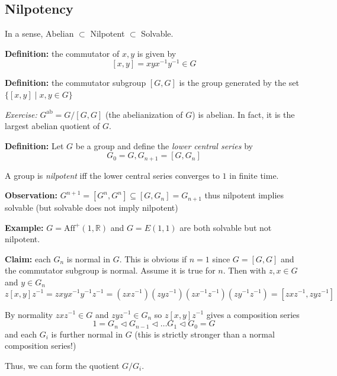 \documentclass[12pt]{article}
\newcommand{\R}{\mathbb{R}}
\begin{document}
\subsection*{Nilpotency} 
    In a sense, Abelian $\subset$ Nilpotent $\subset$ Solvable. 

    \textbf{Definition:} the commutator of $x, y$ is given by 
    \[[x, y] = xyx^{-1}y^{-1} \in G\]

    \textbf{Definition:} the commutator subgroup $[G, G]$ is the group generated by the set $\{[x, y] \; | \; x, y \in G\}$

    \emph{Exercise:} $G^{\text{ab}} = G/[G, G]$ (the abelianization of $G$) is abelian. In fact, it is the largest abelian quotient of $G$. 

    \textbf{Definition:} Let $G$ be a group and define the \emph{lower central series} by  
    \[G_0 = G, G_{n+1} = [G, G_n]\] 
    
    A group is \emph{nilpotent} iff the lower central series converges to $1$ in finite time. 

    \textbf{Observation:} $G^{n+1} = [G^n, G^n] \subseteq [G, G_n] = G_{n+1}$ thus nilpotent implies solvable (but solvable does not imply nilpotent)

    \textbf{Example:} $G = \text{Aff}^+(1, \R)$ and $G = E(1, 1)$ are both solvable but not nilpotent.

    \textbf{Claim:} each $G_n$ is normal in $G$. This is obvious if $n=1$ since $G = [G, G]$ and the commutator subgroup is normal. Assume it is true for $n$. Then with $z, x \in G$ and $y \in G_n$
    \[z[x, y]z^{-1} = zxyx^{-1}y^{-1}z^{-1} = (zxz^{-1})(zyz^{-1})(zx^{-1}z^{-1})(zy^{-1}z^{-1}) = [zxz^{-1}, zyz^{-1}]\] 

    By normality $zxz^{-1} \in G$ and $zyz^{-1} \in G_n$ so $z[x,y]z^{-1}$ gives a composition series 
    \[1 = G_n \triangleleft G_{n-1} \triangleleft \dots G_1 \triangleleft G_0 = G\]
    and each $G_i$ is further normal in $G$ (this is strictly stronger than a normal composition series!)

    Thus, we can form the quotient $G/G_i$. 
\end{document}
